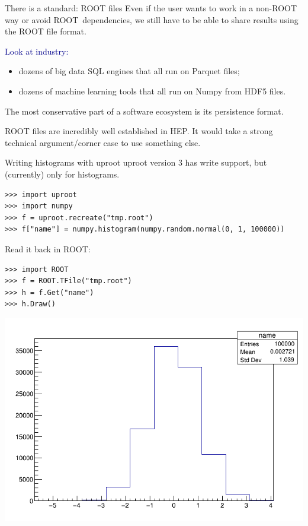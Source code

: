 \documentclass[aspectratio=169]{beamer}
\begin{document}
\begin{frame}{There is a standard: ROOT files}
\large
\vspace{0.5 cm}
Even if the user wants to work in a non-ROOT way or avoid \mbox{ROOT dependencies,\hspace{-0.5 cm}} we still have to be able to share results using the ROOT file format.

\vspace{1 cm}
\textcolor{darkblue}{Look at industry:}
\begin{itemize}
\item dozens of big data SQL engines that all run on Parquet files;
\item dozens of machine learning tools that all run on Numpy from HDF5 files.
\end{itemize}

\vspace{0.25 cm}
The most conservative part of a software ecosystem is its persistence format.

\vspace{1 cm}
ROOT files are incredibly well established in HEP. It would take a strong technical argument/corner case to use something else.
\end{frame}

\begin{frame}[fragile]{Writing histograms with uproot}
\large
\vspace{0.5 cm}
uproot version 3 has write support, but (currently) only for histograms.

\small
\begin{verbatim}
>>> import uproot
>>> import numpy
>>> f = uproot.recreate("tmp.root")
>>> f["name"] = numpy.histogram(numpy.random.normal(0, 1, 100000))
\end{verbatim}

\vspace{1 cm}
\large
Read it back in ROOT:

\small
\begin{verbatim}
>>> import ROOT
>>> f = ROOT.TFile("tmp.root")
>>> h = f.Get("name")
>>> h.Draw()
\end{verbatim}

\vspace{-3.5 cm}
\hfill \includegraphics[width=0.5\linewidth]{root-hist.png}
\end{frame}
\end{document}
